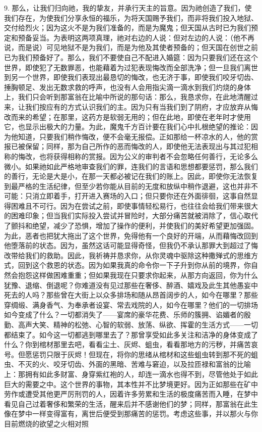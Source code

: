 9. 那么，让我们归向祂，我的挚友，并承行天主的旨意。因为祂创造了我们，使我们存在，为使我们分享永恒的福乐，为将天国赐予我们，而非将我们投入地狱、交付给烈火；因为这火不是为我们准备的，而是为魔鬼；但天国从古时已为我们预定和预备妥当。为表明这两项真理，祂对右边的人说：但对左边的人说：（他不再说，而是说）可见地狱不是为我们，而是为他及其使者预备的；但天国在创世之前已为我们预备好了。那么，我们不要使自己不配进入婚筵：因为只要我们还在这个世界，即使犯了无数罪恶，也能藉着为过犯表现悔改而全部洗净；但一旦我们离世到另一个世界，即使我们表现出最恳切的悔改，也无济于事，即使我们咬牙切齿、捶胸顿足、发出无数求救的呼声，也没有人会用指尖滴一滴水到我们灼烧的身体上，我们只会听到那富翁在比喻中所说的那句话：那么，我恳求你，在此地清醒过来，让我们按应有的方式认识我们的主。因为只有当我们到了阴府，才应放弃从悔改而来的希望；在那里，这药方是软弱无用的；但在此地，即使在老年时才使用它，也显示出极大的力量。为此，魔鬼千方百计要在我们心中扎根绝望的推论：因为他知道，只要我们稍作悔改，便不会毫无报偿。正如那给一杯凉水的人，他的赏报已被保留；同样，那为自己所作的恶而悔改的人，即使他无法表现出与其过犯相称的悔改，也将获得相称的赏报。因为公义的审判者不会忽略任何善行，无论多么微小。如果祂如此严格地审查我们的罪，连我们的言语和思想都要惩罚，那么我们的善行，无论是大是小，在那一天都必被记在我们的账上。因此，即使你无法恢复到最严格的生活纪律，但至少若你能从目前的无度和放纵中稍作退避，这也并非不可能：只消立即着手，打开进入赛场的入口；但只要你还在外面徘徊，这事自然显得困难且不可行。因为在尝试之前，即使事情轻松易行，也往往会给我们带来很大的困难印象；但当我们实际投入尝试并冒险时，大部分痛苦就被消除了，信心取代了颤抖和绝望，减少了恐惧，增加了操作的便利，并使我们的美好希望更加强固。为此，恶者也把犹大拖出了这个世界，免得他有一个良好的开端，从而藉悔改回到他堕落前的状态。因为，虽然这话可能显得奇怪，但我仍不承认那罪大到超过了悔改带给我们的救助。因此，我祈祷并恳求你，从你灵魂中驱除这种撒殚式的思维方式，回到这个救恩的状态。因为如果我真的命令你一下子升到你从前的境界，你自然会抱怨这样做困难重重；但如果我现在只要求你起来，从那方向返回，你为什么犹豫、退缩、倒退呢？你难道没有见过那些在奢侈、醉酒、嬉戏及此生其他愚妄中死去的人吗？那些曾在大街上以众多排场和随从昂首阔步的人，如今在哪里？那些穿绸缎、满身香气、为奉承者设宴、常去戏院的人，如今在哪里？他们的一切排场如今变成了什么？一切都消失了——宴席的豪华花费、乐师的簇拥、谄媚者的殷勤、高声大笑、精神的松弛、心智的软弱、放荡、纵欲、挥霍的生活方式——一切都结束了。如今这一切都逃到哪里去了？那曾享受如此多关注和洁净的身体变成了什么？你到棺材那里去吧，看看尘土、灰烬、蛆虫，看看那地方的污秽，并痛苦哀号。但愿惩罚只限于灰烬！但现在，将你的思绪从棺材和这些蛆虫转到那不死的蛆虫、不灭的火、咬牙切齿、外面的黑暗、苦难与窘迫，以及拉匝禄和富翁的比喻上：那拥有如此多财富、身穿紫红袍的人，却连一滴水也得不到，尽管他处于如此巨大的需要之中。这个世界的事物，其本性并不比梦境更好。因为正如那些在矿中劳作或遭受其他更严厉刑罚的人，因着许多劳累和生活的极度痛苦而入睡，在梦中看见自己过着奢侈和繁荣的生活，醒来后并不感谢他们的梦；同样，那富翁在此生像在梦中一样变得富有，离世后便受到那痛苦的惩罚。考虑这些事，并以那火与你目前燃烧的欲望之火相对照